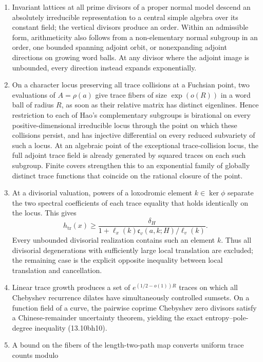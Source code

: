 \documentclass[11pt,reqno]{amsart}
\theoremstyle{definition}
\theoremstyle{remark}
\newcommand{\Tr}{\operatorname{tr}}
\begin{document}
\begin{enumerate}[label=\textup{(\roman*)}]
only matrix sum with large multiplicity is the forced inverse identity
\(A+A^{-1}=(\Tr A)I\); every other sum has representation multiplicity
\(\exp(o(R))\) on a word ball of radius \(R\).
\item Invariant lattices at all prime divisors of a proper normal model
descend an absolutely irreducible representation to a central simple algebra
over its constant field; the vertical divisors produce an order.  Within an
admissible form, arithmeticity also follows from a non-elementary normal
subgroup in an order, one bounded spanning adjoint orbit, or nonexpanding
adjoint directions on growing word balls.  At any divisor where the adjoint
image is unbounded, every direction instead expands exponentially.
\item On a character locus preserving all trace collisions at a Fuchsian
point, two evaluations of \(A=\rho(a)\) give trace fibers of size
\(\exp(o(R))\) in a word ball of radius \(R\), as soon as their relative
matrix has distinct eigenlines.  Hence restriction to
each of Hao's complementary subgroups is birational on every
positive-dimensional irreducible locus through the point on which these
collisions persist, and has injective differential on every reduced
subvariety of such a locus.  At an algebraic point of the exceptional
trace-collision locus, the full adjoint trace field is already generated
by squared traces on each such subgroup.
Finite covers strengthen this to an exponential family of globally distinct
trace functions that coincide on the rational closure of the point.
\item At a divisorial valuation, powers of a loxodromic element
\(k\in\ker\phi\) separate the two spectral coefficients of each trace
equality that holds identically on the locus.  This gives
\[
 h_{\Tr}(x)\ge
 \frac{\delta_H}
 {1+\ell_x(k)\mathfrak c_v(a,k;H)/\ell_v(k)}.
\]
Every unbounded divisorial realization contains such an element \(k\).
Thus all divisorial degenerations with sufficiently large local translation
are excluded; the remaining case is the explicit opposite inequality
between local translation and cancellation.
\item Linear trace growth produces a set of
\(e^{(1/2-o(1))R}\) traces on which all Chebyshev recurrence dilates have
simultaneously controlled sumsets.  On a function field of a curve, the
pairwise coprime Chebyshev zero divisors satisfy a Chinese-remainder
uncertainty theorem, yielding the exact entropy--pole-degree inequality
(13.10bh10).
\item A bound on the fibers of the length-two-path map converts uniform trace counts modulo

\end{enumerate}
\end{document}

